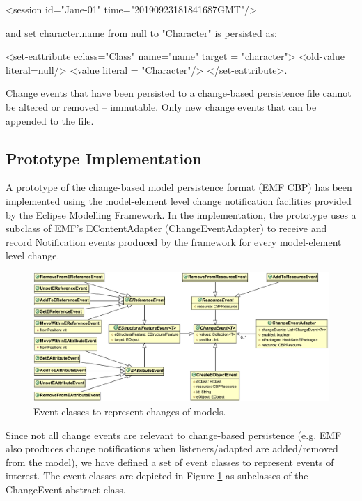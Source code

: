 \textsf{<session id="Jane-01" time="20190923181841687GMT"/>} 

and \textsf{set character.name from null to "Character"} is persisted as:

\textsf{<set-eattribute eclass="Class" name="name" 
target = "character">
<old-value literal=null/>
<value literal = "Character"/>
</set-eattribute>}.

Change events that have been persisted to a change-based persistence file cannot be altered or removed -- immutable. Only new change events that can be appended to the file.

\subsection{Prototype Implementation}
\label{sec:prototype_implementation}

A prototype \cite{epsilonlabs2019emfcbp} of the change-based model persistence format (EMF CBP) has been implemented using the model-element level change notification facilities provided by the Eclipse Modelling Framework. In the implementation, the prototype uses a subclass of EMF's \textsf{EContentAdapter} (\textsf{ChangeEventAdapter}) to receive and record \textsf{Notification} events produced by the framework for every model-element level change.

\begin{figure}[th]
  \centering
  \includegraphics[width=\linewidth]{events}
  \caption{Event classes to represent changes of models.}
  \label{fig:events}
\end{figure}

Since not all change events are relevant to change-based persistence (e.g. EMF also produces change notifications when listeners/adapted are added/removed from the model), we have defined a set of event classes to represent events of interest. The event classes are depicted in Figure \ref{fig:events} as subclasses of the \textsf{ChangeEvent} abstract class.

